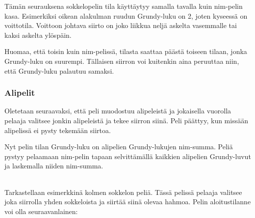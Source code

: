 Tämän seurauksena sokkelopelin
tila käyttäytyy
samalla tavalla kuin nim-pelin kasa.
Esimerkiksi oikean alakulman ruudun
Grundy-luku on 2,
joten kyseessä on voittotila.
Voittoon johtava siirto on joko liikkua neljä
askelta vasemmalle tai kaksi askelta ylöspäin.

Huomaa, että toisin kuin nim-pelissä,
tilasta saattaa päästä toiseen tilaan,
jonka Grundy-luku on suurempi.
Tällaisen siirron voi kuitenkin
aina peruuttaa niin,
että Grundy-luku palautuu samaksi.

\subsubsection{Alipelit}

Oletetaan seuraavaksi, että peli muodostuu
alipeleistä ja jokaisella vuorolla
pelaaja valitsee jonkin alipeleistä ja
tekee siirron siinä.
Peli päättyy, kun missään alipelissä ei
pysty tekemään siirtoa.

Nyt pelin tilan Grundy-luku on alipelien
Grundy-lukujen nim-summa.
Peliä pystyy pelaamaan nim-pelin
tapaan selvittämällä kaikkien alipelien Grundy-luvut
ja laskemalla niiden nim-summa.

~\\
\noindent
Tarkastellaan esimerkkinä kolmen sokkelon peliä.
Tässä pelissä pelaaja valitsee joka siirrolla
yhden sokkeloista ja siirtää siinä olevaa hahmoa.
Pelin aloitustilanne voi olla seuraavanlainen:

